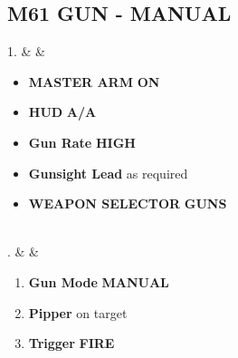 \documentclass[fontInter]{TechCheck}
\begin{document}
	\subsection{M61 GUN - MANUAL}
	\begin{listtabular}
		1. &  &
		\begin{minipage}[t]{\linewidth}
			\vspace{-7pt}
			\begin{itemize}
				\item \textbf{MASTER ARM} \dotfill \textbf{ON}
				\item \textbf{HUD} \dotfill \textbf{A/A}
				\item \textbf{Gun Rate} \dotfill \textbf{HIGH}
				\item \textbf{Gunsight Lead} \dotfill as required
				\item \textbf{WEAPON SELECTOR} \dotfill \textbf{GUNS}
			\end{itemize}
		\end{minipage} \\
		. &  &
		\begin{minipage}[t]{\linewidth}
			\vspace{-7pt}
			\begin{enumerate}
				\item \textbf{Gun Mode} \dotfill \textbf{MANUAL}
				\item \textbf{Pipper} \dotfill on target
				\item \textbf{Trigger} \dotfill \textbf{FIRE}
			\end{enumerate}
		\end{minipage} \\
	\end{listtabular}
\end{document}
